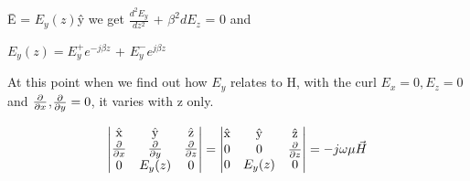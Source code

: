 \={E} = $E_y(z)$\^{y}\hspace{0.15cm} we get\hspace{0.15cm} $\frac{d^2E_y}{dz^2}$ + $\beta^2dE_z$ = 0 and  

$E_y(z) = E_y^+e^{-j\beta z}$ + $E_y^-e^{j\beta z}$

At this point when we find out how $E_y$ relates to H, with the curl $E_x = 0, E_z = 0$ and $\pdv{}{x}$,$\pdv{}{y} = 0$, it varies with z only.

\begin{dmath*}
	\begin{vmatrix}
		$\^{x}$ & $\^{y}$ & $\^{z}$\\
		\frac{\partial}{\partial x} & \frac{\partial}{\partial y} & \frac{\partial}{\partial z}\\
		0 & E_y(z) & 0
	\end{vmatrix} =
	\begin{vmatrix}
		$\^{x}$ & $\^{y}$ & $\^{z}$\\
		0 & 0 & \frac{\partial}{\partial z}\\
		0 & E_y(z) & 0
	\end{vmatrix} =-j\omega\mu\vec{H}
\end{dmath*}


